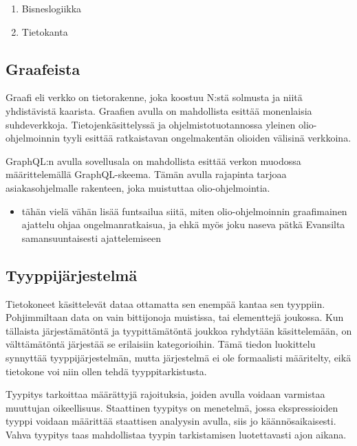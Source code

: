 \begin{enumerate}
\def\labelenumi{\arabic{enumi}.}
\setcounter{enumi}{2}
\tightlist
\item
  Bisneslogiikka
\item
  Tietokanta
\end{enumerate}

\hypertarget{graafeista}{%
\subsection{Graafeista}\label{graafeista}}

Graafi eli verkko on tietorakenne, joka koostuu N:stä solmusta ja niitä
yhdistävistä kaarista.\cite{pozrikidis2014introduction} Graafien avulla
on mahdollista esittää monenlaisia suhdeverkkoja. Tietojenkäsittelyssä
ja ohjelmistotuotannossa yleinen olio-ohjelmoinnin tyyli esittää
ratkaistavan ongelmakentän olioiden välisinä
verkkoina.\cite{booch2008object}

GraphQL:n avulla sovellusala on mahdollista esittää verkon muodossa
määrittelemällä GraphQL-skeema. Tämän avulla rajapinta tarjoaa
asiakasohjelmalle rakenteen, joka muistuttaa
olio-ohjelmointia.\cite{thinkingInGraphsOct2021}

\begin{itemize}
\tightlist
\item
  tähän vielä vähän lisää funtsailua siitä, miten olio-ohjelmoinnin
  graafimainen ajattelu ohjaa ongelmanratkaisua, ja ehkä myös joku
  naseva pätkä Evansilta samansuuntaisesti ajattelemiseen
\end{itemize}

\hypertarget{tyyppijuxe4rjestelmuxe4}{%
\subsection{Tyyppijärjestelmä}\label{tyyppijuxe4rjestelmuxe4}}

Tietokoneet käsittelevät dataa ottamatta sen enempää kantaa sen
tyyppiin. Pohjimmiltaan data on vain bittijonoja muistissa, tai
elementtejä joukossa. Kun tällaista järjestämätöntä ja tyypittämätöntä
joukkoa ryhdytään käsittelemään, on välttämätöntä järjestää se
erilaisiin kategorioihin. Tämä tiedon luokittelu synnyttää
tyyppijärjestelmän, mutta järjestelmä ei ole formaalisti määritelty,
eikä tietokone voi niin ollen tehdä tyyppitarkistusta.

Tyypitys tarkoittaa määrättyjä rajoituksia, joiden avulla voidaan
varmistaa muuttujan oikeellisuus. Staattinen tyypitys on menetelmä,
jossa ekspressioiden tyyppi voidaan määrittää staattisen analyysin
avulla, siis jo käännösaikaisesti. Vahva tyypitys taas mahdollistaa
tyypin tarkistamisen luotettavasti ajon aikana.
\cite{Cardelli+Wegner:1985}

